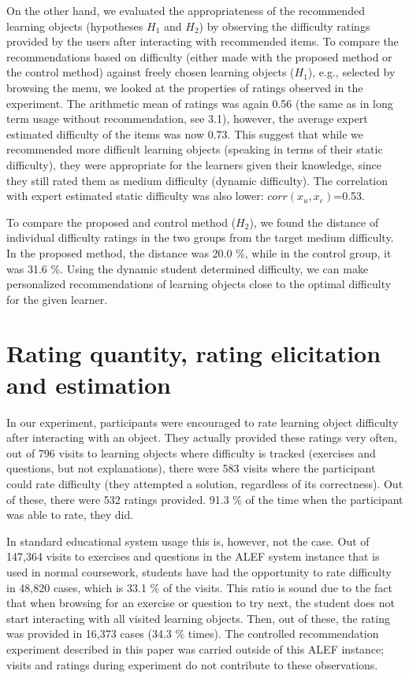 \documentclass{llncs}
\begin{document}
On the other hand, we evaluated the appropriateness of the recommended learning objects (hypotheses $H_1$ and $H_2$) by observing the difficulty ratings provided by the users after interacting with recommended items. To compare the recommendations based on difficulty (either made with the proposed method or the control method) against freely chosen learning objects ($H_1$), e.g., selected by browsing the menu, we looked at the properties of ratings observed in the experiment. The arithmetic mean of ratings was again 0.56 (the same as in long term usage without recommendation, see 3.1), however, the average expert estimated difficulty of the items was now 0.73. This suggest that while we recommended more difficult learning objects (speaking in terms of their static difficulty), they were appropriate for the learners given their knowledge, since they still rated them as medium difficulty (dynamic difficulty). The correlation with expert estimated static difficulty was also lower: $corr(x_u, x_e)$=0.53.

To compare the proposed and control method ($H_2$), we found the distance of individual difficulty ratings in the two groups from the target medium difficulty. In the proposed method, the distance was 20.0 \%, while in the control group, it was 31.6 \%. Using the dynamic student determined difficulty, we can make personalized recommendations of learning objects close to the optimal difficulty for the given learner.

\section{Rating quantity, rating elicitation and estimation}
\label{sec5}

In our experiment, participants were encouraged to rate learning object difficulty after interacting with an object. They actually provided these ratings very often, out of 796 visits to learning objects where difficulty is tracked (exercises and questions, but not explanations), there were 583 visits where the participant could rate difficulty (they attempted a solution, regardless of its correctness). Out of these, there were 532 ratings provided. 91.3 \% of the time when the participant was able to rate, they did.

In standard educational system usage this is, however, not the case. Out of 147,364 visits to exercises and questions in the ALEF system instance that is used in normal coursework, students have had the opportunity to rate difficulty in 48,820 cases, which is 33.1 \% of the visits. This ratio is sound due to the fact that when browsing for an exercise or question to try next, the student does not start interacting with all visited learning objects. Then, out of these, the rating was provided in 16,373 cases (34.3 \% times). The controlled recommendation experiment described in this paper was carried outside of this ALEF instance; visits and ratings during experiment do not contribute to these observations.
\end{document}
